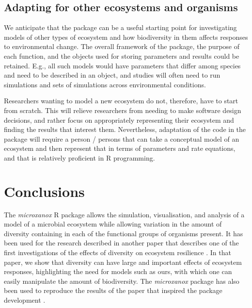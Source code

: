 \documentclass[preprint,12pt, a4paper]{elsarticle}
\begin{document}
\hypertarget{adapting-for-other-ecosystems-and-organisms}{%
\subsection{Adapting for other ecosystems and
organisms}\label{adapting-for-other-ecosystems-and-organisms}}

We anticipate that the package can be a useful starting point for
investigating models of other types of ecosystem and how biodiversity in
them affects responses to environmental change. The overall framework of
the package, the purpose of each function, and the objects used for
storing parameters and results could be retained. E.g., all such models
would have parameters that differ among species and need to be described
in an object, and studies will often need to run simulations and sets of
simulations across environmental conditions.

Researchers wanting to model a new ecosystem do not, therefore, have to
start from scratch. This will relieve researchers from needing to make
software design decisions, and rather focus on appropriately
representing their ecosystem and finding the results that interest them.
Nevertheless, adaptation of the code in the package will require a
person / persons that can take a conceptual model of an ecosystem and
then represent that in terms of parameters and rate equations, and that
is relatively proficient in R programming.

\hypertarget{conclusions}{%
\section{Conclusions}\label{conclusions}}

The \emph{microxanox} R package allows the simulation, visualisation,
and analysis of a model of a microbial ecosystem while allowing
variation in the amount of diversity containing in each of the
functional groups of organisms present. It has been used for the
research described in another paper that describes one of the first
investigations of the effects of diversity on ecosystem resilience
\citet{Limberger2022}. In that paper, we show that diversity can have
large and important effects of ecosystem responses, highlighting the
need for models such as ours, with which one can easily manipulate the
amount of biodiversity. The \emph{microxanox} package has also been used
to reproduce the results of the paper that inspired the package
development \citep{Bush2017}.
\end{document}
